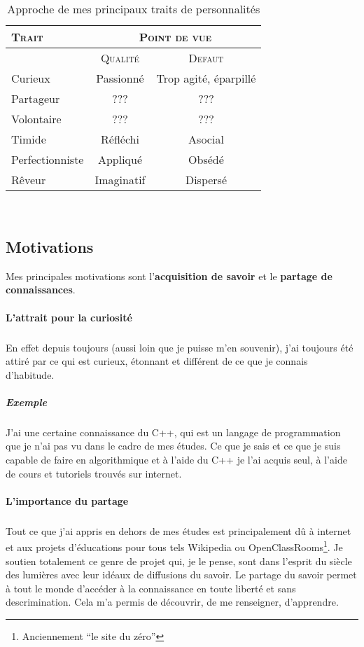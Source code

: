 \documentclass[a4paper,12pt, draft]{report}
\newcommand{\tabTitle}[1]{\hfill{} \textsc{#1} \hfill{} }
\begin{document}
\begin{table}[h]
  \begin{tabular}{|l|c|c|}
    \hline

  \tabTitle{Trait} & \multicolumn{2}{c|}{\tabTitle{Point de vue}} \\
\hline
 & \tabTitle{Qualité} & \tabTitle{Defaut} \\
\hline
  Curieux & Passionné & Trop agité, éparpillé \\
  \hline
  Partageur & ??? & ???\\
  \hline
  Volontaire & ??? & ??? \\
  \hline
  Timide & Réfléchi & Asocial \\
  \hline
  Perfectionniste & Appliqué & Obsédé \\
  \hline
  Rêveur & Imaginatif & Dispersé \\
  \hline


    
  \end{tabular}\\
\caption{Approche de mes principaux traits de personnalités}
\end{table}


\subsection{Motivations}
Mes principales motivations sont  l'\textbf{acquisition de savoir} et 
le \textbf{partage de connaissances}. 

\paragraph{L'attrait pour la curiosité}
\subparagraph{}
En effet depuis toujours (aussi loin que je puisse m'en souvenir), j'ai toujours été attiré par ce qui est curieux, étonnant et différent de ce que je connais d'habitude.
\subparagraph{Exemple}
J'ai une certaine connaissance du C++, qui est un langage de programmation que je n'ai pas vu dans le cadre de mes études.  Ce que je sais et ce que je suis capable de faire en algorithmique et à l'aide du C++ je l'ai acquis seul, à l'aide de cours et tutoriels trouvés sur internet. 

 

\paragraph{L'importance du partage}
\subparagraph{}
Tout ce que j'ai appris en dehors de mes études est principalement dû à internet et aux projets d'éducations pour tous tels Wikipedia ou OpenClassRooms\footnote{Anciennement ``le site du zéro''}.
Je soutien totalement ce genre de projet qui, je le pense, sont dans l'esprit du siècle des lumières avec leur idéaux de diffusions du savoir. Le partage du savoir permet à tout le monde d'accéder à la connaissance en toute liberté et sans descrimination. Cela m'a permis de découvrir, de me renseigner, d'apprendre. 
\end{document}
